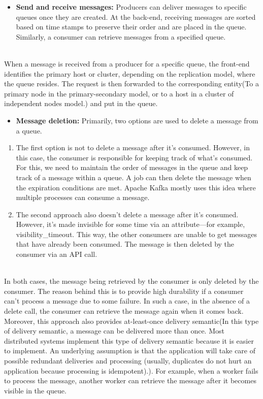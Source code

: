 \begin{itemize}
\item
\protect{}\label{mcV7VGqIG8yFDrpjnh5vP}
\textbf{Send and receive messages:} Producers can deliver messages to specific queues once they are created. At the back-end, receiving messages are sorted based on time stamps to preserve their order and are placed in the queue. Similarly, a consumer can retrieve messages from a specified queue.
\end{itemize}
\\
When a message is received from a producer for a specific queue, the front-end identifies the primary host or cluster, depending on the replication model, where the queue resides. The request is then forwarded to the corresponding entity(To a primary node in the primary-secondary model, or to a host in a cluster of independent nodes model.) and put in the queue.

\begin{itemize}
\item
\protect{}\label{7WWSe_xF0zqOwLn-vRHF1}
\textbf{Message deletion:} Primarily, two options are used to delete a message from a queue.
\end{itemize}

\begin{enumerate}
\item
\protect{}\label{vonxpRWWKOxz2QFn2ZvLy}
The first option is not to delete a message after it's consumed. However, in this case, the consumer is responsible for keeping track of what's consumed. For this, we need to maintain the order of messages in the queue and keep track of a message within a queue. A job can then delete the message when the expiration conditions are met. Apache Kafka mostly uses this idea where multiple processes can consume a message.
\item
\protect{}\label{NykJFH4NeWmr5VYbBEM0D}
The second approach also doesn't delete a message after it's consumed. However, it's made invisible for some time via an attribute---for example, visibility\_timeout. This way, the other consumers are unable to get messages that have already been consumed. The message is then deleted by the consumer via an API call.
\end{enumerate}
\\
In both cases, the message being retrieved by the consumer is only deleted by the consumer. The reason behind this is to provide high durability if a consumer can't process a message due to some failure. In such a case, in the absence of a delete call, the consumer can retrieve the message again when it comes back.
\\
Moreover, this approach also provides at-least-once delivery semantic(In this type of delivery semantic, a message can be delivered more than once. Most distributed systems implement this type of delivery semantic because it is easier to implement. An underlying assumption is that the application will take care of possible redundant deliveries and processing (usually, duplicates do not hurt an application because processing is idempotent).). For example, when a worker fails to process the message, another worker can retrieve the message after it becomes visible in the queue.

